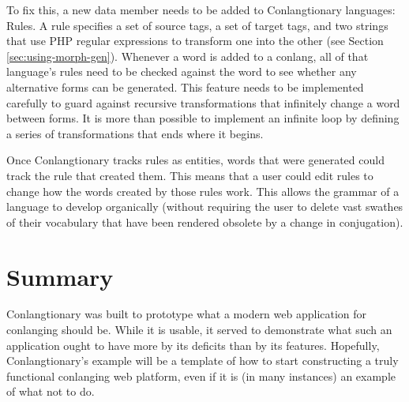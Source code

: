 To fix this, a new data member needs to be added to Conlangtionary languages: Rules. A rule specifies a set of source tags, a set of target tags, and two strings that use PHP regular expressions to transform one into the other (see Section \ref{sec:using-morph-gen}). Whenever a word is added to a conlang, all of that language's rules need to be checked against the word to see whether any alternative forms can be generated. This feature needs to be implemented carefully to guard against recursive transformations that infinitely change a word between forms. It is more than possible to implement an infinite loop by defining a series of transformations that ends where it begins.

Once Conlangtionary tracks rules as entities, words that were generated could track the rule that created them. This means that a user could edit rules to change how the words created by those rules work. This allows the grammar of a language to develop organically (without requiring the user to delete vast swathes of their vocabulary that have been rendered obsolete by a change in conjugation).

\section{Summary}
\label{sec:refactor-summary}

Conlangtionary was built to prototype what a modern web application for conlanging should be. While it is usable, it served to demonstrate what such an application ought to have more by its deficits than by its features. Hopefully, Conlangtionary's example will be a template of how to start constructing a truly functional conlanging web platform, even if it is (in many instances) an example of what not to do.